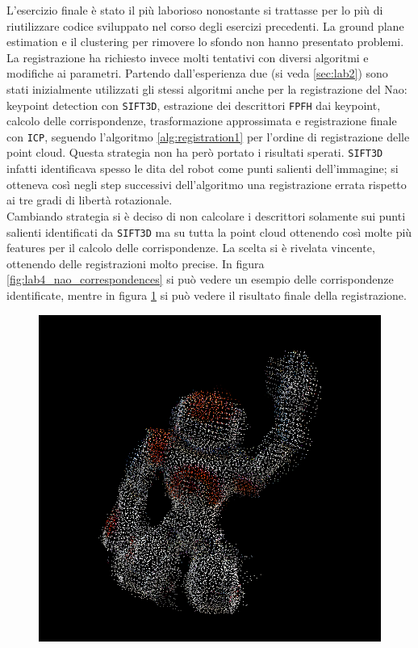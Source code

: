 \documentclass[a4paper]{article}
\begin{document}
	L'esercizio finale è stato il più laborioso nonostante si trattasse per lo più di riutilizzare codice sviluppato nel corso degli esercizi precedenti. La ground plane estimation e il clustering per rimovere lo sfondo non hanno presentato problemi. La registrazione ha richiesto invece molti tentativi con diversi algoritmi e modifiche ai parametri. Partendo dall'esperienza due (si veda \ref{sec:lab2}) sono stati inizialmente utilizzati gli stessi algoritmi anche per la registrazione del Nao: keypoint detection con \verb|SIFT3D|, estrazione dei descrittori \verb|FPFH| dai keypoint, calcolo delle corrispondenze, trasformazione approssimata e registrazione finale con \verb|ICP|, seguendo l'algoritmo \ref{alg:registration1} per l'ordine di registrazione delle point cloud. Questa strategia non ha però portato i risultati sperati. \verb|SIFT3D| infatti identificava spesso le dita del robot come punti salienti dell'immagine; si otteneva così negli step successivi dell'algoritmo una registrazione errata rispetto ai tre gradi di libertà rotazionale. \\
	Cambiando strategia si è deciso di non calcolare i descrittori solamente sui punti salienti identificati da \verb|SIFT3D| ma su tutta la point cloud ottenendo così molte più features per il calcolo delle corrispondenze. La scelta si è rivelata vincente, ottenendo delle registrazioni molto precise. In figura \ref{fig:lab4_nao_correspondences} si può vedere un esempio delle corrispondenze identificate, mentre in figura \ref{fig:lab4_nao_registered} si può vedere il risultato finale della registrazione.
	
	
	
	
	

	\begin{figure}
		\centering
		\includegraphics[width=1\textwidth]{images/lab4_nao_registered.png}
		\caption{\label{fig:lab4_nao_registered}}
	\end{figure}
\end{document}
